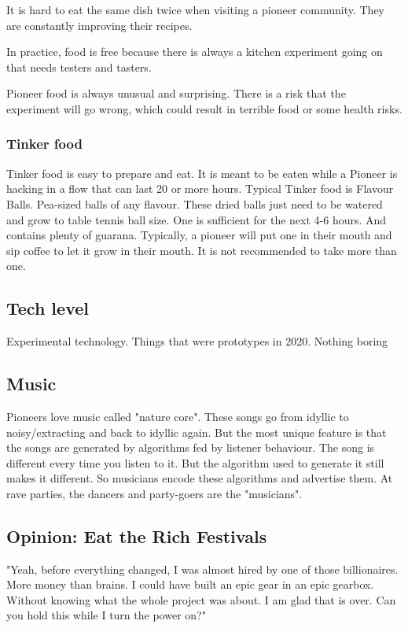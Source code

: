 It is hard to eat the same dish twice when visiting a pioneer community. They are constantly improving their recipes.

In practice, food is free because there is always a kitchen experiment going on that needs testers and tasters.

Pioneer food is always unusual and surprising. There is a risk that the experiment will go wrong, which could result in terrible food or some health risks.

\subsubsection{Tinker food}

Tinker food is easy to prepare and eat. It is meant to be eaten while a Pioneer is hacking in a flow that can last 20 or more hours. Typical Tinker food is Flavour Balls. Pea-sized balls of any flavour. These dried balls just need to be watered and grow to table tennis ball size. One is sufficient for the next 4-6 hours. And contains plenty of guarana.
Typically, a pioneer will put one in their mouth and sip coffee to let it grow in their mouth. It is not recommended to take more than one.

\subsection{Tech level}

Experimental technology. Things that were prototypes in 2020. Nothing boring

\subsection{Music}

Pioneers love music called "nature core". These songs go from idyllic to noisy/extracting and back to idyllic again. But the most unique feature is that the songs are generated by algorithms fed by listener behaviour.
The song is different every time you listen to it. But the algorithm used to generate it still makes it different. So musicians encode these algorithms and advertise them. At rave parties, the dancers and party-goers are the "musicians".

\subsection{Opinion: Eat the Rich Festivals}

"Yeah, before everything changed, I was almost hired by one of those billionaires. More money than brains. I could have built an epic gear in an epic gearbox. Without knowing what the whole project was about. I am glad that is over. Can you hold this while I turn the power on?"

